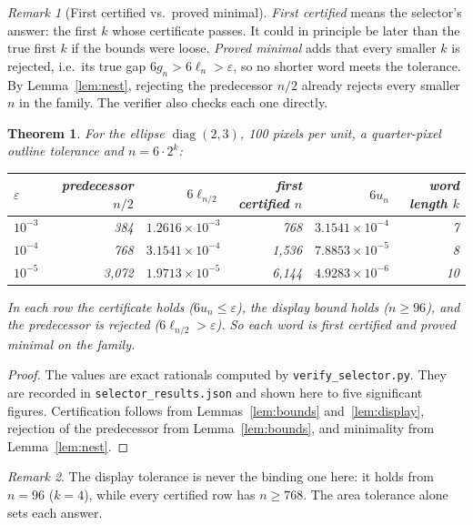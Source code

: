 \documentclass[11pt]{article}
\newtheorem{theorem}{Theorem}
\theoremstyle{definition}
\theoremstyle{remark}
\newtheorem*{remark}{Remark}
\begin{document}
\begin{remark}[First certified vs.\ proved minimal]
\emph{First certified} means the selector's answer: the first $k$ whose certificate passes. It could in principle be
later than the true first $k$ if the bounds were loose. \emph{Proved minimal} adds that every smaller $k$ is rejected,
i.e.\ its true gap $6g_n>6\ell_n>\varepsilon$, so no shorter word meets the tolerance. By Lemma~\ref{lem:nest},
rejecting the predecessor $n/2$ already rejects every smaller $n$ in the family. The verifier also checks each one
directly.
\end{remark}

\begin{theorem}
For the ellipse $\operatorname{diag}(2,3)$, 100 pixels per unit, a quarter-pixel outline tolerance and
$n=6\cdot2^k$:
\begin{center}
\begin{tabular}{@{}lrrrrr@{}}
\toprule
$\varepsilon$ & predecessor $n/2$ & $6\ell_{n/2}$ & first certified $n$ & $6u_n$ & word length $k$\\
\midrule
$10^{-3}$ & 384 & $1.2616\times10^{-3}$ & 768 & $3.1541\times10^{-4}$ & 7\\
$10^{-4}$ & 768 & $3.1541\times10^{-4}$ & 1{,}536 & $7.8853\times10^{-5}$ & 8\\
$10^{-5}$ & 3{,}072 & $1.9713\times10^{-5}$ & 6{,}144 & $4.9283\times10^{-6}$ & 10\\
\bottomrule
\end{tabular}
\end{center}
In each row the certificate holds ($6u_n\le\varepsilon$), the display bound holds ($n\ge96$), and the predecessor is
rejected ($6\ell_{n/2}>\varepsilon$). So each word is first certified and proved minimal on the family.
\end{theorem}
\begin{proof}
The values are exact rationals computed by \texttt{verify\_selector.py}. They are recorded in
\texttt{selector\_results.json} and shown here to five significant figures. Certification follows from Lemmas~\ref{lem:bounds} and~\ref{lem:display},
rejection of the predecessor from Lemma~\ref{lem:bounds}, and minimality from Lemma~\ref{lem:nest}.
\end{proof}

\begin{remark}
The display tolerance is never the binding one here: it holds from $n=96$ ($k=4$), while every certified row has
$n\ge768$. The area tolerance alone sets each answer.
\end{remark}
\end{document}
